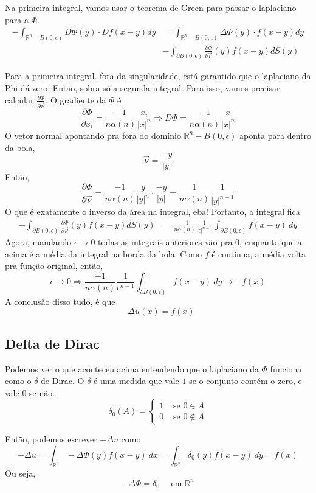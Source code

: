 \documentclass[11pt]{article}
\newcommand{\Rn}{{\mathbb{R}^n}}
\newcommand{\p}{\partial}
\newcommand{\e}{\epsilon}
\newcommand{\pde}[2]{\frac{\p #1}{\p #2}}
\newcommand{\dirdev}[1]{\pde{#1}{\vec{\nu}}}
\begin{document}
Na primeira integral, vamos usar o teorema de Green para passar o laplaciano para a \(\Phi\). \begin{align*}
	 - \int_{\mathbb{R}^n - B(0, \epsilon)} D \Phi (y)\cdot D f(x-y) dy &= \int_{\mathbb{R}^n - B(0, \epsilon)} \Delta \Phi (y)\cdot f(x-y) dy \\ &-  \int_{\partial B(0, \epsilon)} \dirdev{\Phi }(y) f(x-y) dS(y)
\end{align*}

Para a primeira integral. fora da singularidade, está garantido que o laplaciano da Phi dá zero. Então, sobra só a segunda integral. Para isso, vamos precisar calcular \(\dirdev{\Phi}\). O gradiente da \(\Phi\) é \[\pde{\Phi}{x_i}= \frac{-1}{n \alpha(n)} \frac{x_i}{|x|^n} \Longrightarrow D\Phi = \frac{-1}{n \alpha(n)}\frac{x}{|x|^n}\]
O vetor normal apontando pra fora do domínio \(\Rn - B(0,\e)\) aponta para dentro da bola, \[\vec{\nu} = \frac{-y}{|y|}\]
Então, \[\dirdev{\Phi} =  \frac{-1}{n \alpha(n)}\frac{y}{|y|^n} \cdot \frac{-y}{|y|} = \frac{1}{n \alpha(n)} \frac{1}{|y|^{n-1}}\]
O que é exatamente o inverso da área na integral, eba! Portanto, a integral fica \begin{align*}
	 -  \int_{\partial B(0, \epsilon)} \dirdev{\Phi }(y) f(x-y) dS(y) &= \frac{-1}{n \alpha(n)} \frac{1}{|\e|^{n-1}}  \int_{\partial B(0, \epsilon)} f(x-y)\ dy 
\end{align*}
Agora, mandando \(\e \rightarrow 0 \) todas as integrais anteriores vão pra \(0\), enquanto que a acima é a média da integral na borda da bola. Como \(f\) é contínua, a média volta pra função original, então, \[\e \rightarrow 0 \Longrightarrow \frac{-1}{n \alpha(n)} \frac{1}{\e^{n-1}}  \int_{\partial B(0, \epsilon)} f(x-y)\ dy  \rightarrow -f(x) \]		
A conclusão disso tudo, é que
\[ -\Delta u(x) = f(x) \]

\subsection{Delta de Dirac}

Podemos ver o que aconteceu acima entendendo que o laplaciano da \(\Phi\) funciona como o \(\delta\) de Dirac. O \(\delta\) é uma medida que vale \(1\) se o conjunto contém o zero, e vale \(0\) se não. \[\delta_0(A) = \begin{cases}
	1 & \text{ se } 0 \in A \\
	0 & \text{ se } 0 \notin A
\end{cases}\]

Então, podemos escrever \(-\Delta u \) como \[-\Delta u = \int_\Rn -\Delta \Phi(y) f(x-y)\ dx = \int_\Rn \delta_0(y) f(x-y)\ dy = f(x)\]
Ou seja, \[-\Delta\Phi = \delta_0 \quad \text{ em }\Rn \]
\end{document}
